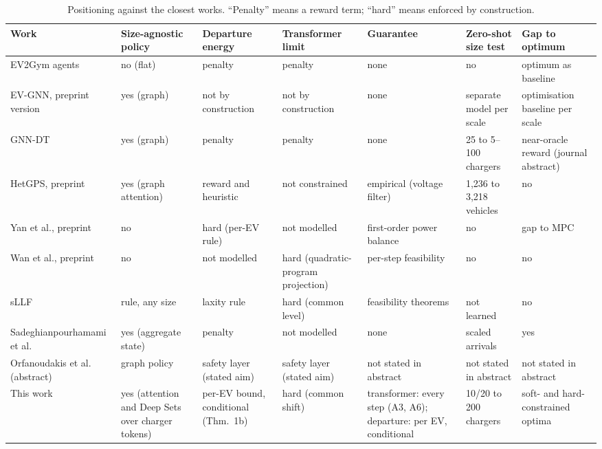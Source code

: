 \begin{table}[t]
\centering
\caption{Positioning against the closest works. ``Penalty'' means a reward term; ``hard'' means enforced by construction.}
\label{tab:positioning}
\footnotesize
\setlength{\tabcolsep}{3pt}
\begin{tabular}{@{}>{\raggedright}p{2.6cm}>{\raggedright}p{2.0cm}>{\raggedright}p{2.0cm}>{\raggedright}p{2.0cm}>{\raggedright}p{2.2cm}>{\raggedright}p{1.9cm}>{\raggedright\arraybackslash}p{2.0cm}@{}}
\toprule
Work & Size-agnostic policy & Departure energy & Transformer limit & Guarantee & Zero-shot size test & Gap to optimum \\
\midrule
EV2Gym agents \cite{orfanoudakis2025ev2gym} & no (flat) & penalty & penalty & none & no & optimum as baseline \\
EV-GNN, preprint version \cite{orfanoudakis2025scalable} & yes (graph) & not by construction & not by construction & none & separate model per scale & optimisation baseline per scale \\
GNN-DT \cite{orfanoudakis2026graph} & yes (graph) & penalty & penalty & none & 25 to 5--100 chargers & near-oracle reward (journal abstract) \\
HetGPS, preprint \cite{wang2026hetgps} & yes (graph attention) & reward and heuristic & not constrained & empirical (voltage filter) & 1,236 to 3,218 vehicles & no \\
Yan et al., preprint \cite{yan2026hierarchical} & no & hard (per-EV rule) & not modelled & first-order power balance & no & gap to MPC \\
Wan et al., preprint \cite{wan2025logicinformed} & no & not modelled & hard (quadratic-program projection) & per-step feasibility & no & no \\
sLLF \cite{chen2022smoothed} & rule, any size & laxity rule & hard (common level) & feasibility theorems & not learned & no \\
Sadeghian\-pourhamami et al. \cite{sadeghianpourhamami2020definition} & yes (aggregate state) & penalty & not modelled & none & scaled arrivals & yes \\
Orfanoudakis et al. \cite{orfanoudakis2026can} (abstract) & graph policy & safety layer (stated aim) & safety layer (stated aim) & not stated in abstract & not stated in abstract & not stated in abstract \\
\midrule
This work & yes (attention and Deep Sets over charger tokens) & per-EV bound, conditional (Thm.~1b) & hard (common shift) & transformer: every step (A3, A6); departure: per EV, conditional & 10/20 to 200 chargers & soft- and hard-constrained optima \\
\bottomrule
\end{tabular}
\end{table}
